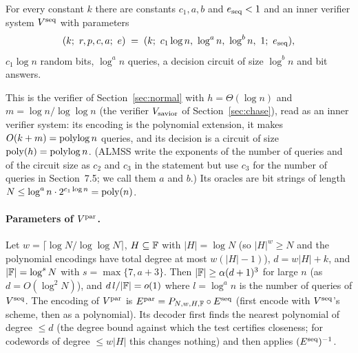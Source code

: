 \begin{theorem}\label{thm:seq}
For every constant $k$ there are constants $c_1,a,b$ and $e_{\rm seq}<1$ and an inner verifier system $V^{\rm seq}$ with parameters
\[
  (k;\ r,p,c,a;\ e)\;=\;(k;\ c_1\log n,\ \log^an,\ \log^bn,\ 1;\ e_{\rm seq}),
\]
\ie $c_1\log n$ random bits, $\log^an$ queries, a decision circuit of size $\log^bn$ and bit answers.
\end{theorem}

\noindent
This is the verifier of Section~\ref{sec:normal} with $h=\Theta(\log n)$ and $m=\log n/\log\log n$ (the verifier $V_{\rm savior}$ of Section~\ref{sec:chase}), read as an inner verifier system: its encoding is the polynomial extension, it makes $O(k+m)=\operatorname{polylog} n$ queries, and its decision is a circuit of size $\operatorname{poly}(h)=\operatorname{polylog} n$.  (ALMSS write the exponents of the number of queries and of the circuit size as $c_2$ and $c_3$ in the statement but use $c_3$ for the number of queries in Section~7.5; we call them $a$ and $b$.)  Its oracles are bit strings of length $N\le\log^an\cdot2^{c_1\log n}=\operatorname{poly}(n)$.

\paragraph{Parameters of $V^{\rm par}$.}  Let $w=\lceil\log N/\log\log N\rceil$, $H\subseteq\mathbb{F}$ with $|H|=\log N$ (so $|H|^w\ge N$ and the polynomial encodings have total degree at most $w(|H|-1)$), $d=w|H|+k$, and $|\mathbb{F}|=\log^sN$ with $s=\max\{7,a+3\}$.  Then $|\mathbb{F}|\ge\alpha(d+1)^3$ for large $n$ (as $d=O(\log^2N)$),
and $d\,l/|\mathbb{F}|=o(1)$ where $l=\log^an$ is the number of queries of $V^{\rm seq}$.  The encoding of $V^{\rm par}$ is $E^{\rm par}=P_{N,w,H,\mathbb{F}}\circ E^{\rm seq}$ (first encode with $V^{\rm seq}$'s scheme, then as a polynomial).  Its decoder first finds the nearest polynomial of degree $\le d$
(the degree bound against which the test certifies closeness; for codewords of degree $\le w|H|$ this changes nothing) and then applies $(E^{\rm seq})^{-1}$.

